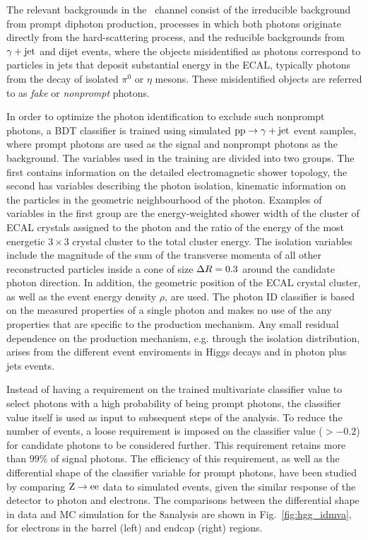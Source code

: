 \documentclass[12pt,twoside,a4paper,cmspaper,final,collab]{cms-tdr}
\begin{document}
The relevant backgrounds in the  \HGG\ channel consist of the irreducible background
from prompt diphoton production, \ie processes in which both photons originate directly
from the hard-scattering process, and the reducible
backgrounds from $\gamma + \text{jet}$ and dijet events,
where the objects misidentified
as photons
correspond to particles in jets that deposit substantial energy in the ECAL, typically photons from
the decay of isolated $\pi^0$ or $\eta$ mesons.
These misidentified objects are referred to as \emph{fake} or \emph{nonprompt} photons.

In order to optimize the photon identification to exclude such nonprompt
photons, a BDT classifier is trained using simulated $\mathrm{p}\mathrm{p}\to\gamma + \text{jet}$ event samples,
where prompt photons are used as the signal and nonprompt photons as the background.
The variables used in the training are divided into two groups.
The first contains information on the detailed electromagnetic shower topology,
the second has variables describing the photon isolation, \ie kinematic information on the
particles in the geometric neighbourhood of the photon. Examples of variables in the first group are the
energy-weighted shower width of the cluster of ECAL crystals assigned to the photon and the ratio of the
energy of the  most energetic $3\times3$ crystal cluster to the total cluster energy.
The isolation variables include  the magnitude of the sum of the transverse  momenta
of all other reconstructed particles inside a cone of size $\Delta R=0.3$ around the candidate photon direction.
In addition, the
geometric position of the ECAL crystal cluster, as well as the event energy density
$\rho$,
are used.
The photon ID classifier is based on the measured properties of a single photon and makes no use of the 
any properties that are specific to the production mechanism. 
Any small residual dependence on the production mechanism, e.g. through the isolation distribution, 
arises from the different event enviroments in Higgs decays and in photon plus jets events. 

Instead of having a requirement on the trained multivariate classifier value to select photons
with a high probability of being prompt photons, the classifier value itself is used
as input to subsequent steps of the analysis. To reduce the number of events, a loose requirement
is imposed on the  classifier value (${>}-0.2$) for candidate photons to be considered further.
This requirement retains more than $99\%$ of signal photons.
The efficiency of this requirement, as well as the differential shape of the classifier
variable for prompt photons, have been studied by comparing $\mathrm{Z}\to \mathrm{e}\mathrm{e}$
data to simulated events,  given the similar response of the detector to photon and electrons.
The comparisons between the differential shape in data and MC simulation for the 8\TeV analysis
are shown in Fig.~\ref{fig:hgg_idmva},
for electrons in the barrel (left) and endcap (right) regions.
\end{document}
